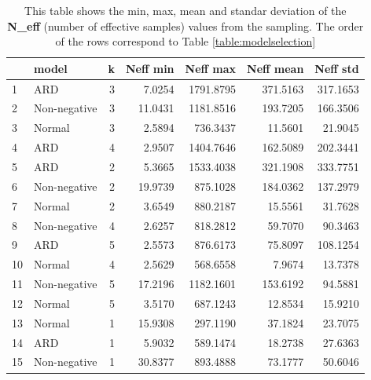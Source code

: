 \documentclass[12pt]{article}
\begin{document}
    \begin{table}[H]
        \centering
        \caption{This table shows the min, max, mean and standar deviation of the \textbf{N\_eff} (number of effective samples) values from the sampling. The order of the rows correspond to Table \ref{table:modelselection}}
        \begin{tabular}{llr|rr|rr}
            \toprule
            {} &         model &  k &  Neff min &  Neff max &  Neff mean &  Neff std \\
            \midrule
            1  &           ARD &  3 &    7.0254 & 1791.8795 &   371.5163 &  317.1653 \\
            2  &  Non-negative &  3 &   11.0431 & 1181.8516 &   193.7205 &  166.3506 \\
            3  &        Normal &  3 &    2.5894 &  736.3437 &    11.5601 &   21.9045 \\
            4  &           ARD &  4 &    2.9507 & 1404.7646 &   162.5089 &  202.3441 \\
            5  &           ARD &  2 &    5.3665 & 1533.4038 &   321.1908 &  333.7751 \\
            6  &  Non-negative &  2 &   19.9739 &  875.1028 &   184.0362 &  137.2979 \\
            7  &        Normal &  2 &    3.6549 &  880.2187 &    15.5561 &   31.7628 \\
            8  &  Non-negative &  4 &    2.6257 &  818.2812 &    59.7070 &   90.3463 \\
            9  &           ARD &  5 &    2.5573 &  876.6173 &    75.8097 &  108.1254 \\
            10 &        Normal &  4 &    2.5629 &  568.6558 &     7.9674 &   13.7378 \\
            11 &  Non-negative &  5 &   17.2196 & 1182.1601 &   153.6192 &   94.5881 \\
            12 &        Normal &  5 &    3.5170 &  687.1243 &    12.8534 &   15.9210 \\
            13 &        Normal &  1 &   15.9308 &  297.1190 &    37.1824 &   23.7075 \\
            14 &           ARD &  1 &    5.9032 &  589.1474 &    18.2738 &   27.6363 \\
            15 &  Non-negative &  1 &   30.8377 &  893.4888 &    73.1777 &   50.6046 \\
            \bottomrule
        \end{tabular}
    \end{table}
\end{document}
